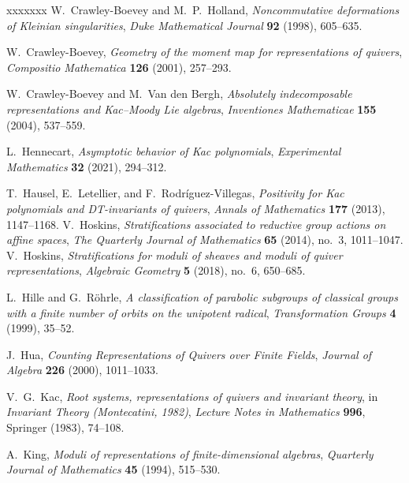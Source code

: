 \documentclass[12pt]{amsart}
\theoremstyle{plain}
\theoremstyle{definition}
\theoremstyle{remark}
\begin{document}
\begin{thebibliography}{xxxxxxx}
W.~Crawley-Boevey and M.~P.~Holland, {\it Noncommutative deformations of Kleinian singularities},
{\it Duke Mathematical Journal} \textbf{92} (1998), 605--635.

W.~Crawley-Boevey, {\it Geometry of the moment map for representations of quivers},
{\it Compositio Mathematica} \textbf{126} (2001), 257--293.

W.~Crawley-Boevey and M.~Van den Bergh, {\it Absolutely indecomposable representations and Kac--Moody Lie algebras},
{\it Inventiones Mathematicae} \textbf{155} (2004), 537--559.

L.~Hennecart, {\it Asymptotic behavior of Kac polynomials},
{\it Experimental Mathematics} \textbf{32} (2021), 294--312.

T.~Hausel, E.~Letellier, and F.~{Rodr{\'i}guez}-Villegas, {\it Positivity for Kac polynomials and DT-invariants of quivers},
{\it Annals of Mathematics} \textbf{177} (2013), 1147--1168.
V.~Hoskins, {\it Stratifications associated to reductive group actions on affine spaces},
{\it The Quarterly Journal of Mathematics} {\bf 65} (2014), no.~3, 1011--1047.
V.~Hoskins, {\it Stratifications for moduli of sheaves and moduli of quiver representations},
{\it Algebraic Geometry} {\bf 5} (2018), no.~6, 650--685.

L.~Hille and G.~Röhrle, {\it A classification of parabolic subgroups of classical groups with a finite number of orbits on the unipotent radical},
{\it Transformation Groups} \textbf{4} (1999), 35--52.

J.~Hua, {\it Counting Representations of Quivers over Finite Fields}, {\it Journal of  Algebra} \textbf{226} (2000), 1011--1033.


V.~G.~Kac, {\it Root systems, representations of quivers and invariant theory},
in {\it Invariant Theory (Montecatini, 1982)},
{\it Lecture Notes in Mathematics} \textbf{996}, Springer (1983), 74--108.

A.~King, {\it Moduli of representations of finite-dimensional algebras},
{\it Quarterly Journal of Mathematics} \textbf{45} (1994), 515--530.


\end{thebibliography}
\end{document}
